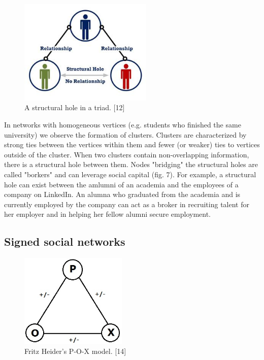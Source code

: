 \documentclass[conference,letterpaper]{IEEEtran}
\begin{document}
\begin{center}
\begin{figure}[hb]
\centering
\includegraphics[width=2.5in]{structural_hole}
\caption{
A structural hole in a triad. [12]
}
\label{fig_sim}
\end{figure}
\end{center}

In networks with homogeneous vertices (e.g. students who finished the same university) we observe the formation of clusters. Clusters are characterized by strong ties between the vertices within them and fewer (or weaker) ties to vertices outside of the cluster. When two clusters contain non-overlapping information, there is a structural hole between them. Nodes "bridging" the structural holes are called "borkers" and can leverage social capital (fig. 7). For example, a structural hole can exist between the amlumni of an academia and the employees of a company on LinkedIn. An alumna who graduated from the academia and is currently employed by the company can act as a broker in recruiting talent for her employer and in helping her fellow alumni secure employment.\\

\subsection{Signed social networks}

\begin{center}
\begin{figure}[hb]
\centering
\includegraphics[width=2.0in]{pox}
\caption{
Fritz Heider's P-O-X model. [14]
}
\label{fig_sim}
\end{figure}
\end{center}
\end{document}
